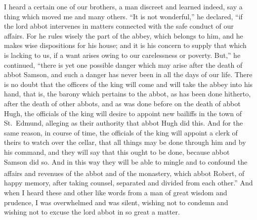 \documentclass[10pt]{book}
\newcounter{engnote}
\newcommand{\engnotenum}{\textsuperscript{\arabic{engnote}\stepcounter{engnote}}}
\begin{document}
\begin{paracol}{2}
I heard a certain one of our brothers, a man discreet and learned indeed, say a thing which moved me and many others. ``It is not wonderful,'' he declared, ``if the lord abbot intervenes in matters connected with the safe conduct of our affairs. For he rules wisely the part of the abbey, which belongs to him, and he makes wise dispositions for his house; and it is his concern to supply that which is lacking to us, if a want arises owing to our carelessness or poverty. But,'' he continued, ``there is yet one possible danger which may arise after the death of abbot Samson, and such a danger has never been in all the days of our life. There is no doubt that the officers of the king will come and will take the abbey into his hand, that is, the barony which pertains to the abbot, as has been done hitherto, after the death of other abbots, and as was done before on the death of abbot Hugh, the officials of the king will desire to appoint new bailiffs in the town of St.\ Edmund, alleging as their authority that abbot Hugh did this. And for the same reason, in course of time, the officials of the king will appoint a clerk of theirs to watch over the cellar, that all things may be done through him and by his command, and they will say that this ought to be done, because abbot Samson did so. And in this way they will be able to mingle and to confound the affairs and revenues of the abbot and of the monastery, which abbot Robert,\engnotenum{} of happy memory, after taking counsel, separated and divided from each other.'' And when I heard these and other like words from a man of great wisdom and prudence, I was overwhelmed and was silent, wishing not to condemn and wishing not to excuse the lord abbot in so great a matter.

\switchcolumn*


\end{paracol}
\end{document}
